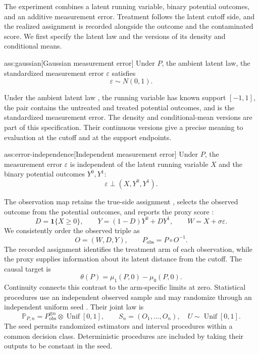 \documentclass[11pt]{article}
\begin{document}
The experiment combines a latent running variable, binary potential outcomes, and an additive measurement error. Treatment follows the latent cutoff side, and the realized assignment is recorded alongside the outcome and the contaminated score. We first specify the latent law and the versions of its density and conditional means.

\begin{assumptionv}{ass:gaussian}[Gaussian measurement error]
Under \(P\), the ambient latent law, the standardized measurement error \(\varepsilon\) satisfies
\[
\varepsilon\sim N(0,1).
\]
\end{assumptionv}

Under the ambient latent law , the running variable  has known support \([-1,1]\), the pair  contains the untreated and treated potential outcomes, and  is the standardized measurement error. The density  and conditional-mean versions  are part of this specification. Their continuous versions give a precise meaning to evaluation at the cutoff and at the support endpoints.

\begin{assumptionv}{ass:error-independence}[Independent measurement error]
Under \(P\), the measurement error \(\varepsilon\) is independent of the latent running variable \(X\) and the binary potential outcomes \(Y^0,Y^1\):
\[
\varepsilon\perp(X,Y^0,Y^1).
\]
\end{assumptionv}

The observation map retains the true-side assignment , selects the observed outcome  from the potential outcomes, and reports the proxy score :
\[
D=\mathbf1\{X\ge0\},\qquad
Y=(1-D)Y^0+DY^1,\qquad
W=X+\sigma\varepsilon.
\]
We consistently order the observed triple as
\[
O=(W,D,Y),\qquad
P_{\mathrm{obs}}=P\circ O^{-1}.
\]
The recorded assignment identifies the treatment arm of each observation, while the proxy supplies information about its latent distance from the cutoff. The causal target  is
\[
\theta(P)=\mu_1(P,0)-\mu_0(P,0).
\]
Continuity connects this contrast to the arm-specific limits at zero. Statistical procedures use an independent observed sample  and may randomize through an independent uniform seed . Their joint law is
\[
\mathbb P_{P,n}=P_{\mathrm{obs}}^{\otimes n}\otimes\operatorname{Unif}[0,1],
\qquad
S_n=(O_1,\ldots,O_n),\quad U\sim\operatorname{Unif}[0,1].
\]
The seed permits randomized estimators and interval procedures within a common decision class. Deterministic procedures are included by taking their outputs to be constant in the seed.
\end{document}
